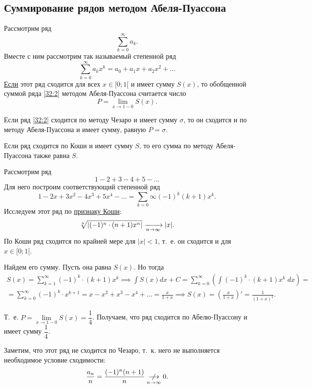 \documentclass[../../main.tex]{subfiles}
\begin{document}
\subsection{Суммирование рядов методом Абеля-Пуассона}

Рассмотрим ряд
\begin{equation}
 \label{32:2}
 \sum\limits_{k=0}^\infty a_k.
\end{equation}
Вместе с ним рассмотрим так называемый степенной ряд
\[\sum\limits_{k=0}^\infty a_kx^k = a_0 + a_1x + a_2x^2 + \dots\]
\underline{Если} этот ряд сходится для всех $x \in [0;1[$ и имеет сумму 
$S(x)$, то обобщенной суммой ряда \eqref{32:2} методом Абеля-Пуассона 
считается число \[P = \lim_{x\to1-0}S(x).\]

\begin{thm}
 Если ряд \eqref{32:2} сходится по методу Чезаро и имеет сумму $\sigma$, то он 
 сходится и по методу Абеля-Пуассона и имеет сумму, равную $P = \sigma$.
\end{thm}

\begin{crl*}
 Если ряд сходится по Коши и имеет сумму $S$, то его сумма по методу 
 Абеля-Пуассона также равна $S$.
\end{crl*}

\begin{exmp}
Рассмотрим ряд \[1-2+3-4+5-\dots\] Для него построим соответствующий степенной 
ряд \[1-2x+3x^2-4x^3 + 5x^4 - \dots = \sum_{k=0}\infty (-1)^k(k+1)x^k.\]
Исследуем этот ряд по \hyperref[lec27:cauchy]{признаку Коши}:
\[\sqrt[n]{\left|{(-1)^n\cdot(n+1)x^n}\right|} \xrightarrow[n\to\infty]{} |x|.\]
По Коши ряд сходится по крайней мере для $|x| < 1$, т.~е. он сходится и для $x 
\in [0;1[$.

Найдем его сумму. Пусть она равна $S(x)$. Но тогда
\begin{gather*}
 S(x) = \sum\limits_{k=1}^\infty (-1)^k\cdot(k+1)x^k \implies \int S(x)dx + C 
 = \sum\limits_{k=0}^\infty \left(\int (-1)^k\cdot(k+1)x^k\;dx\right) = \\ =
 \sum\limits_{k=0}^\infty (-1)^k\cdot x^{k+1} =
 x - x^2 + x^3 - x^4 + \dots = \frac x{1+x} \implies S(x) = \left(\frac 
 x{1+x}\right)' = \frac 1{(1+x)^2}.
\end{gather*}

Т.~е. $P = \lim\limits_{x\to1-0} S(x) = \dfrac14$. Получаем, что ряд сходится 
по Абелю-Пуассону и имеет сумму $\dfrac14$.

Заметим, что этот ряд не сходится по Чезаро, т.~к. него не выполняется 
необходимое условие сходимости: \[\frac{a_n}n = \frac{(-1)^n(n+1)}n 
\underset{n\to\infty}{\centernot\longrightarrow} 0.\]
\end{exmp}
\end{document}
